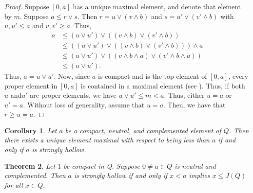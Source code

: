 \documentclass[11pt,english]{amsart}
\newtheorem{theorem}{Theorem}[section]
\newtheorem{corollary}[theorem]{Corollary}
\theoremstyle{definition}
\numberwithin{equation}{section}
\theoremstyle{remark}
\def\leq{\leqslant}
\begin{document}
	\begin{proof}
		Suppose $[0,a]$ has a unique maximal element, and denote that element by $m$. Suppose $a\leq r\vee s$. Then $r=u\vee (v\wedge b)$ and $s=u'\vee(v'\wedge b)$ with $u,u'\leq a$ and $v,v'\geqslant a$. Thus,
		\begin{align*}
			a&\leq (u\vee u')\vee\left((v\wedge b)\vee(v'\wedge b) \right)\\
			&\leq((u\vee u')\vee\left((v\wedge b)\vee(v'\wedge b) \right))\wedge a \\
			&\leq (u\vee u')\vee((v\wedge b\wedge a)\vee(v'\wedge b\wedge a)) \\
			&\leq(u\vee u').
		\end{align*}
		Thus, $a=u\vee u'$. Now, since $a$ is compact and is the top element of $[0,a]$, every proper element in \([0,a]\) is contained in a maximal element (see \cite[Lemma 2.3(2)]{Z-Lat}). Thus,  if  both $u$ and$u'$ are proper elements, we have $u\vee u'\leq m<a$. Thus, either $u=a$ or $u'=a$. Without loss of generality, assume that $u=a$. Then, we have that $r\geqslant u =a$.
	\end{proof}
    \begin{corollary}\label{T2.18}
        Let $a$ be a compact, neutral, and complemented element of $Q$. Then there exists a unique  element  maximal with respect to being less than $a$ if and only if  $a$ is strongly hollow.
    \end{corollary}
	\begin{theorem}\label{T2.20}
		Let $1$ be compact in Q. Suppose $0\neq a\in Q$ is neutral and complemented. Then $a$ is strongly hollow if and only if $x<a$ implies $x\leq J(Q)$ for all $x\in Q$.
	\end{theorem}
	
\end{document}
